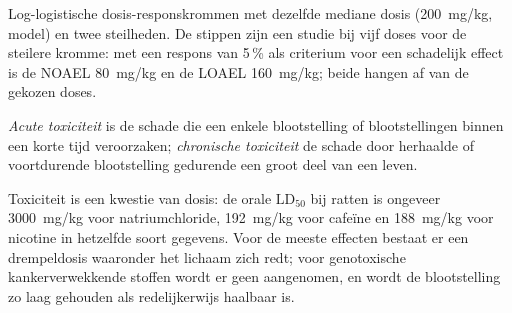 \begin{omfigure}

{\small Log-logistische dosis-responskrommen met dezelfde mediane dosis
(\qty{200}{mg/kg}, model) en twee steilheden. De stippen zijn een studie
bij vijf doses voor de steilere kromme: met een respons van 5\,\% als
criterium voor een schadelijk effect is de NOAEL
\qty{80}{mg/kg} en de LOAEL \qty{160}{mg/kg}; beide hangen af van de gekozen doses.}
\end{omfigure}

\begin{definition}\label{def:b3:environmental-toxicology:toxicity}
\emph{Acute toxiciteit} is de schade die een
enkele blootstelling of blootstellingen binnen een korte tijd
veroorzaken; \emph{chronische toxiciteit} de
schade door herhaalde of voortdurende blootstelling gedurende een groot
deel van een leven.
\end{definition}

Toxiciteit is een kwestie van dosis: de orale $\mathrm{LD_{50}}$ bij ratten is ongeveer \qty{3000}{mg/kg} voor natriumchloride,
\qty{192}{mg/kg} voor cafeïne en \qty{188}{mg/kg} voor nicotine in hetzelfde soort gegevens. Voor de
meeste effecten bestaat er een drempeldosis waaronder het lichaam zich
redt; voor genotoxische kankerverwekkende stoffen wordt er geen
aangenomen, en wordt de blootstelling zo laag gehouden als redelijkerwijs
haalbaar is.

